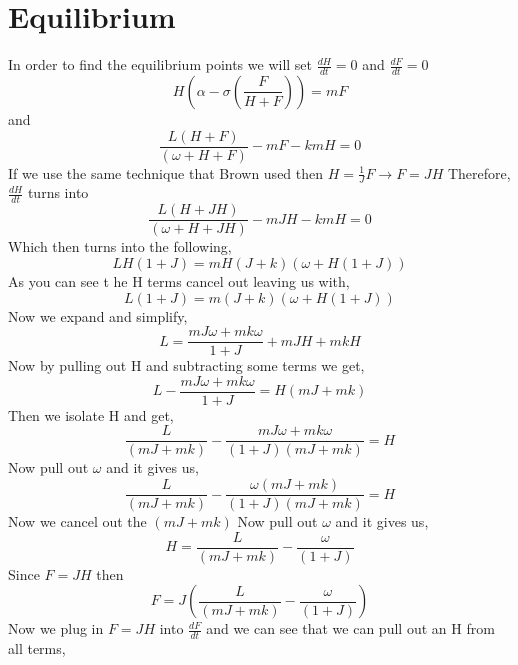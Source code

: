 \documentclass[a4paper,10pt]{article}
\begin{document}
\section{Equilibrium}
In order to find the equilibrium points we will set $\frac{dH}{dt} = 0$ and $\frac{dF}{dt} = 0$ 
\begin{displaymath}
H(\alpha - \sigma (\frac{F}{H+F})) = mF
\end{displaymath}
and
\begin{displaymath}
\frac{L(H+F)}{(\omega +H+F)}-mF-kmH =0
\end{displaymath}
If we use the same technique that Brown used then $H = \frac{1}{J}F \rightarrow F = JH$ Therefore, $\frac{dH}{dt}$ turns into 
\begin{displaymath}
\frac{L(H+JH)}{(\omega +H+JH)}-mJH-kmH =0
\end{displaymath}
Which then turns into the following,
\begin{displaymath}
LH(1+J)=mH(J+k)(\omega + H(1+J))
\end{displaymath}
As you can see t he H terms cancel out leaving us with,
\begin{displaymath}
L(1+J)=m(J+k)(\omega + H(1+J))
\end{displaymath}
Now we expand and simplify,
\begin{displaymath}
L = \frac{mJ\omega +mk\omega}{1+J}+mJH+mkH
\end{displaymath}
Now by pulling out H and subtracting some terms we get, 
\begin{displaymath}
L - \frac{mJ\omega +mk\omega}{1+J}=H(mJ+mk)
\end{displaymath}
Then we isolate H and get,
\begin{displaymath}
\frac{L}{(mJ+mk)} - \frac{mJ\omega +mk\omega}{(1+J)(mJ+mk)}=H
\end{displaymath}
Now pull out $\omega$ and it gives us, 
\begin{displaymath}
\frac{L}{(mJ+mk)} - \frac{\omega(mJ +mk)}{(1+J)(mJ+mk)}=H
\end{displaymath}
Now we cancel out the $(mJ +mk)$
Now pull out $\omega$ and it gives us, 
\begin{displaymath}
H = \frac{L}{(mJ+mk)} - \frac{\omega}{(1+J)}
\end{displaymath}
Since $F=JH$ then 
\begin{displaymath}
F = J (\frac{L}{(mJ+mk)} - \frac{\omega}{(1+J)})
\end{displaymath}
Now we plug in $F=JH$ into $\frac{dF}{dt}$ and we can see that we can pull out an H from all terms,
\end{document}
